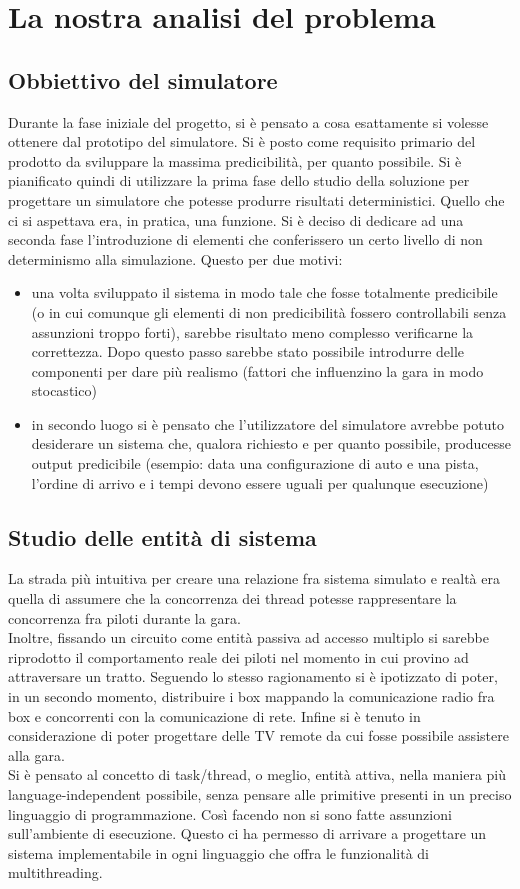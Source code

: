 \section{La nostra analisi del problema}
\subsection{Obbiettivo del simulatore}
Durante la fase iniziale del progetto, si è pensato a cosa esattamente si volesse ottenere dal prototipo del simulatore. Si è posto come requisito primario del prodotto da sviluppare la massima predicibilità, per quanto possibile. Si è pianificato quindi di utilizzare la prima fase dello studio della soluzione per progettare un simulatore che potesse produrre risultati deterministici. Quello che ci si aspettava era, in pratica, una funzione. Si è deciso di dedicare ad una seconda fase l'introduzione di elementi che conferissero un certo livello di non determinismo alla simulazione. Questo per due motivi:
\begin{itemize}
               \item una volta sviluppato il sistema in modo tale che fosse totalmente predicibile (o in cui comunque gli elementi di non predicibilità fossero controllabili senza assunzioni troppo forti), sarebbe risultato meno complesso verificarne la correttezza. Dopo questo passo sarebbe stato possibile introdurre delle componenti per dare più realismo (fattori che influenzino la gara in modo stocastico)
                \item in secondo luogo si è pensato che l’utilizzatore del simulatore avrebbe potuto desiderare un sistema che, qualora richiesto e per quanto possibile, producesse output predicibile (esempio: data una configurazione di auto e una pista, l’ordine di arrivo e i tempi devono essere uguali per qualunque esecuzione)
\end{itemize}
\subsection{Studio delle entità di sistema}
La strada più intuitiva per creare una relazione fra sistema simulato e realtà era quella di assumere che la concorrenza dei thread potesse rappresentare la concorrenza fra piloti durante la gara.\\
Inoltre, fissando un circuito come entità passiva ad accesso multiplo si sarebbe riprodotto il comportamento reale dei piloti nel momento in cui provino ad attraversare un tratto.
Seguendo lo stesso ragionamento si è ipotizzato di poter, in un secondo momento, distribuire i box mappando la comunicazione radio fra box e concorrenti con la comunicazione di rete. Infine si è tenuto in considerazione di poter progettare delle TV remote da cui fosse possibile assistere alla gara.\\
Si è pensato al concetto di task/thread, o meglio, entità attiva, nella maniera più language-independent possibile, senza pensare alle primitive presenti in un preciso linguaggio di programmazione. Così facendo non si sono fatte assunzioni sull'ambiente di esecuzione. Questo ci ha permesso di arrivare a progettare un sistema implementabile in ogni linguaggio che offra le funzionalità di multithreading.
